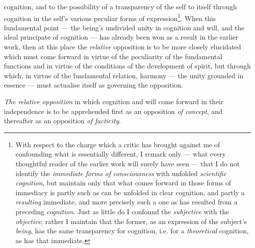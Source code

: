 \documentclass[12pt,a4paper]{book}
\begin{document}
cognition, and to the possibility of a transparency of the self to itself
through cognition in the self's various peculiar forms of
expression\footnote{With respect to the charge which a critic has brought
against me of confounding what is essentially different, I remark only --- what
every thoughtful reader of the earlier work will surely have seen --- that I do
not identify the \emph{immediate forms of consciousness} with unfolded
\emph{scientific cognition}, but maintain only that what comes forward in those
forms of immediacy is partly such as can be unfolded in clear cognition, and
partly a \emph{resulting} immediate, and more precisely such a one as has
resulted from a preceding \emph{cognition}. Just as little do I confound the
\emph{subjective} with the \emph{objective}; rather I maintain that the former,
as an expression of the subject's \emph{being}, has the same transparency for
cognition, i.e. for a \emph{theoretical} cognition, as has that immediate.}.
When this fundamental point --- the being's undivided unity in cognition and
will, and the ideal principate of cognition --- has already been won as a
result in the earlier work, then at this place the \emph{relative} opposition
is to be more closely elucidated which must come forward in virtue of the
peculiarity of the fundamental functions and in virtue of the conditions of
the development of spirit, but through which, in virtue of the fundamental
relation, harmony --- the unity grounded in essence --- must actualise itself
as governing the opposition.

\emph{The relative opposition} in which cognition and will come forward in
their independence is to be apprehended first as an opposition
\emph{of concept}, and thereafter as an opposition \emph{of facticity}.
\end{document}
